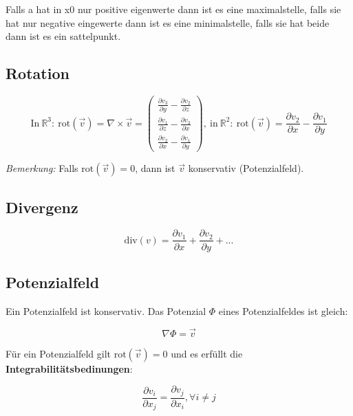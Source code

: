\documentclass[11pt]{article}
\begin{document}
Falls a hat in x0 nur positive eigenwerte dann ist es eine maximalstelle, falls sie hat nur negative eingewerte dann ist es eine minimalstelle, falls sie hat beide dann ist es ein sattelpunkt.

\subsection{Rotation}

\begin{equation*}
	\text{In}\ \mathbb{R}^3:\ \text{rot}(\vec{v})=\nabla\times \vec{v} =
	\begin{pmatrix}
		\frac{\partial v_3}{\partial y} - \frac{\partial v_2}{\partial z}\\
		\frac{\partial v_1}{\partial z} - \frac{\partial v_3}{\partial x}\\
		\frac{\partial v_2}{\partial x} - \frac{\partial v_1}{\partial y}
	\end{pmatrix},\ \text{in}\ \mathbb{R}^2:\ \text{rot}(\vec{v}) = \frac{\partial v_2}{\partial x} - \frac{\partial v_1}{\partial y}
\end{equation*}

\emph{Bemerkung:} Falls $\text{rot}(\vec{v})=0$, dann ist $\vec{v}$ konservativ (Potenzialfeld).

\subsection{Divergenz}
\begin{equation*}
	\text{div}(v)= \frac{\partial v_1}{\partial x} + \frac{\partial v_2}{\partial y} + ... 
\end{equation*}

\subsection{Potenzialfeld}

Ein Potenzialfeld ist konservativ. Das Potenzial $\Phi$ eines Potenzialfeldes ist gleich:

\begin{equation*}
	\nabla \Phi = \vec{v}
\end{equation*}

F{\"u}r ein Potenzialfeld gilt $\text{rot}(\vec{v})=0$ und es erf{\"u}llt die \textbf{Integrabilit{\"a}tsbedinungen}:

\begin{equation*}
	\frac{\partial v_i}{\partial x_j}=\frac{\partial v_j}{\partial x_i},\forall i \neq j
\end{equation*}
\end{document}
